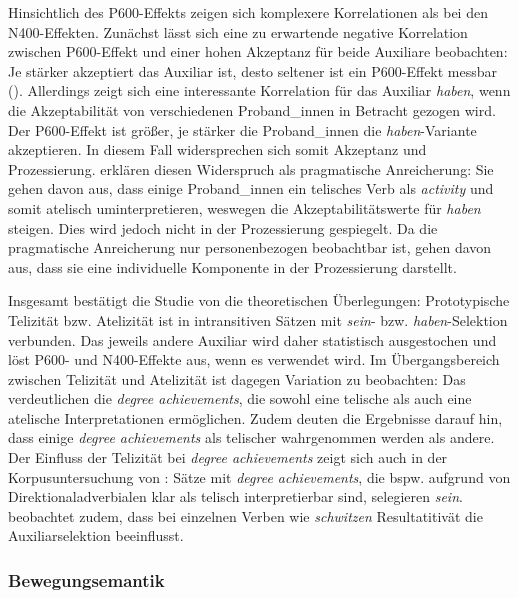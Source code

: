  

Hinsichtlich des P600-Effekts zeigen sich komplexere Korrelationen als bei den N400-Effekten. Zunächst lässt sich eine zu erwartende negative Korrelation zwischen P600-Effekt und einer hohen Akzeptanz für beide Auxiliare beobachten: Je stärker akzeptiert das Auxiliar ist, desto seltener ist ein P600-Effekt messbar (\cite[1269]{Roehm.2013}). Allerdings  zeigt sich eine interessante Korrelation für das Auxiliar \textit{haben}, wenn die Akzeptabilität von verschiedenen Pro\-\mbox{band\_in}\-nen in Betracht gezogen wird. Der P600-Effekt ist größer, je stärker die Pro\-\mbox{band\_in}\-nen die \textit{haben}-Variante akzeptieren. In diesem Fall widersprechen sich somit Akzeptanz und Prozessierung. \textcite[1269]{Roehm.2013} erklären diesen Widerspruch als pragmatische Anreicherung: Sie gehen davon aus, dass einige Proband\_innen ein telisches Verb als \textit{activity} und somit atelisch uminterpretieren, weswegen die Akzeptabilitätswerte für \textit{haben} steigen. Dies wird jedoch nicht in der Prozessierung gespiegelt. Da die pragmatische Anreicherung nur personenbezogen beobachtbar ist, gehen \textcite[1269]{Roehm.2013} davon aus, dass sie eine individuelle Komponente in der Prozessierung darstellt.

Insgesamt bestätigt die Studie von \textcite{Roehm.2013} die theoretischen Überlegungen: Prototypische Telizität bzw. Atelizität ist in intransitiven Sätzen mit \textit{sein}- bzw. \textit{haben}-Selektion verbunden. Das jeweils andere Auxiliar wird daher statistisch ausgestochen und löst P600- und N400-Effekte aus, wenn es verwendet wird. Im Übergangsbereich zwischen Telizität und Atelizität ist dagegen Variation zu beobachten: Das verdeutlichen die \textit{degree achievements}, die sowohl eine telische als auch eine atelische Interpretationen ermöglichen. Zudem deuten die Ergebnisse darauf hin, dass einige \textit{degree achievements} als telischer wahrgenommen werden als andere. Der Einfluss der Telizität bei \textit{degree achievements} zeigt sich auch in der Korpusuntersuchung von \textcite{Gillmann.2016}: Sätze mit \textit{degree achievements}, die bspw. aufgrund von Direktionaladverbialen klar als telisch interpretierbar sind, selegieren \textit{sein}. \textcite{Gillmann.2016} beobachtet zudem, dass bei einzelnen Verben  wie \textit{schwitzen} Resultatitivät die Auxiliarselektion beeinflusst.

\subsubsection{Bewegungsemantik}\label{Bewegung}

